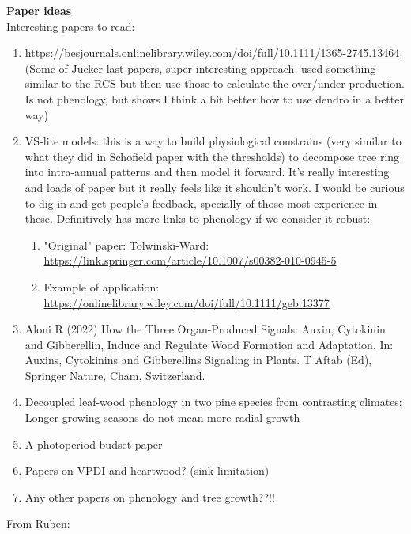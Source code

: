 \documentclass[11pt,letter]{article}
\begin{document}
\begin{enumerate}
{\bf Paper ideas}\\
Interesting papers to read:
\begin{enumerate}
\item \url{https://besjournals.onlinelibrary.wiley.com/doi/full/10.1111/1365-2745.13464} (Some of Jucker last papers, super interesting approach, used something similar to the RCS but then use those to calculate the over/under production. Is not phenology, but shows I think a bit better how to use dendro in a better way)
\item VS-lite models: this is a way to build physiological constrains (very similar to what they did in Schofield paper with the thresholds) to decompose tree ring into intra-annual patterns and then model it forward. It's really interesting and loads of paper but it really feels like it shouldn't work. I would be curious to dig in and get people's feedback, specially of those most experience in these. Definitively has more links to phenology if we consider it robust:
\begin{enumerate}
\item "Original" paper: Tolwinski-Ward: \url{https://link.springer.com/article/10.1007/s00382-010-0945-5}
\item Example of application: \url{https://onlinelibrary.wiley.com/doi/full/10.1111/geb.13377}
\end{enumerate}
\item Aloni R (2022) How the Three Organ-Produced Signals: Auxin, Cytokinin and Gibberellin, Induce and Regulate Wood Formation and Adaptation. In: Auxins, Cytokinins and Gibberellins Signaling in Plants. T Aftab (Ed), Springer Nature, Cham, Switzerland. %
\item Decoupled leaf-wood phenology in two pine species from contrasting climates: Longer growing seasons do not mean more radial growth
\item A photoperiod-budset paper
\item Papers on VPDI and heartwood? (sink limitation)
\item Any other papers on phenology and tree growth??!!
\end{enumerate}



From Ruben:


\end{enumerate}
\end{document}
